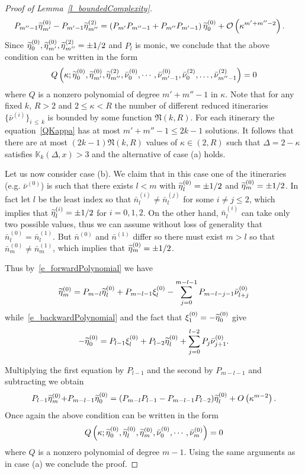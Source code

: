 \documentclass[10pt]{amsart}
\theoremstyle{definition}\newtheorem{defi}[theo]{Definition}\newtheorem{rema}[theo]{Remark}\newtheorem{exam}[theo]{Example}\newtheorem{exem}[theo]{Example}\newtheorem{nota}[theo]{Notation}
\newcommand{\LC}{\mathbb{K}}
\newcommand{\fkN}{\mathfrak{N}}
\newcommand{\cO}{\mathcal{O}}
\newcommand{\indexItinPrivate}[1]{^{(#1)}}
\newcommand{\dnt}[1]{\bar\nu\indexItinPrivate{#1}}
\newcommand{\nt}[1]{\bar n\indexItinPrivate{#1}}
\newcommand{\xit}[1]{\xi\indexItinPrivate{#1}}
\newcommand{\teta}{\tilde\eta}
\newcommand{\tetat}[1]{\teta\indexItinPrivate{#1}}
\let\oldtilde\tilde
\renewcommand*{\tilde}[1]{\mathchoice{\widetilde{#1}}{\widetilde{#1}}{\oldtilde{#1}}{\oldtilde{#1}}}
\begin{document}
\begin{proof}[Proof of Lemma~\ref{l_boundedComplexity}]
\begin{align*}
P_{m''-1}\tetat0_{m'}-P_{m'-1}\tetat2_{m''} &= \left(P_{m'}P_{m''-1}+P_{m''}P_{m'-1}\right)\tetat0_{0}+\cO\left(\kappa^{m'+m''-2}\right).
\end{align*}
Since $\tetat0_0, \tetat0_{m'}, \tetat2_{m''} = \pm1/2$ and $P_l$ is monic, we conclude that the above condition can be written in the form
\begin{align}\label{QKappa}
Q\left(\kappa;\tetat0_0,\tetat0_{m'},\tetat2_{m''},\dnt0_0,\cdots,\dnt0_{m'-1},\dnt2_0,\dots,\dnt2_{m''-1}\right) = 0
\end{align}
where $Q$ is a nonzero polynomial of degree $m'+m''-1$ in $\kappa$. Note that for any fixed $k$, $R > 2$ and $2\le \kappa < R$ the number of different reduced itineraries $\{\dnt{i}\}_{i\,\leq\,k}$ is bounded by some function $\fkN(k, R).$ For each itinerary the equation~\eqref{QKappa} has at most $m'+m''-1\leq 2k-1$ solutions. It follows that there are at most $(2k-1) \fkN(k, R)$ values of $\kappa\in (2, R)$ such that $\Delta=2-\kappa$ satisfies $\LC_k(\Delta,x) > 3$ and the alternative of case (a) holds.

Let us now consider case (b). We claim that in this case one of the itineraries (e.g. $\dnt0$) is such that there exists $l < m$ with $\tetat0_l = \pm1/2$ and $\tetat0_m = \pm1/2$. In fact let $l$ be the least index so that $\nt{i}_l\ne\nt{j}_l$ for some $i\!\ne\! j\!{ \le\! 2}$, which implies that $\tetat{i}_l = \pm1/2$ for $i = 0,1,2$. On the other hand, $\nt{i}_l$ can take only two possible values, thus we can assume without loss of generality that $\nt{0}_l = \nt{1}_l$. But $\nt0$ and $\nt1$ differ so there must exist $m > l$ so that $\nt{0}_m\ne\nt{1}_m$, which implies that $\tetat{0}_m = \pm1/2$.

Thus by~\eqref{e_forwardPolynomial} we have
\begin{align*}
\tetat0_{m} = P_{m-l}\tetat0_l + P_{m-l-1}\xit0_l - \sum_{j = 0}^{m-l-1}P_{m-l-j-1}\dnt0_{l+j}
\end{align*}
while~\eqref{e_backwardPolynomial} and the fact that $\xit0_1=-\tetat0_0$ give
\begin{align*}
{-}\tetat0_{0} = P_{l-1}\xit0_l + P_{l-2}\tetat0_l + \sum_{j = 0}^{l-2}P_j\dnt0_{j+1}.
\end{align*}

Multiplying the first equation by $P_{l-1}$ and the second by $P_{m-l-1}$ and subtracting we obtain
\begin{align*}
P_{l-1}\tetat0_m{+}P_{m-l-1}\tetat0_0 = (P_{m-l}P_{l-1}-P_{m-l-1}P_{l-2})\tetat0_l+O\left(\kappa^{m-2}\right).
\end{align*}
Once again the above condition can be written in the form
\begin{align*}
Q\left(\kappa;\tetat0_0,\tetat0_l,\tetat0_m,\dnt0_0,\cdots,\dnt0_m\right) = 0
\end{align*}
where $Q$ is a nonzero polynomial of degree $m-1$. Using the same arguments as in case (a) we conclude the proof.
\end{proof}
\end{document}
